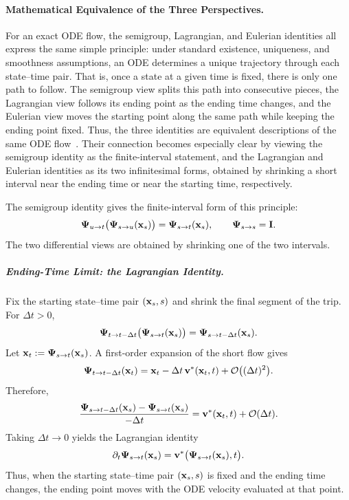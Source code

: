 \paragraph{Mathematical Equivalence of the Three Perspectives.}
For an exact ODE flow, the semigroup, Lagrangian, and Eulerian identities
all express the same simple principle: under standard existence,
uniqueness, and smoothness assumptions, an ODE determines a unique
trajectory through each state--time pair. That is, once a state at a
given time is fixed, there is only one path to follow. The semigroup view
splits this path into consecutive pieces, the Lagrangian view follows its
ending point as the ending time changes, and the Eulerian view moves the
starting point along the same path while keeping the ending point fixed.
Thus, the three identities are equivalent descriptions of the same ODE
flow~\citep{arnold1988geometrical,chorin1993mathematical}. Their
connection becomes especially clear by viewing the semigroup identity as
the finite-interval statement, and the Lagrangian and Eulerian identities
as its two infinitesimal forms, obtained by shrinking a short interval near the ending time or near the
starting time, respectively.

The semigroup identity gives the finite-interval form of this principle:
\[
    {\bm{\Psi}}_{u\to t}\big({\bm{\Psi}}_{s\to u}({\mathbf{x}}_s)\big)
    =
    {\bm{\Psi}}_{s\to t}({\mathbf{x}}_s),
    \qquad
    {\bm{\Psi}}_{s\to s}={\mathbf{I}} .
\]
The two differential views are obtained by shrinking one of the two intervals.

\subparagraph{Ending-Time Limit: the Lagrangian Identity.}
Fix the starting state--time pair $({\mathbf{x}}_s,s)$ and shrink the final
segment of the trip. For $\Delta t>0$,
\[
    {\bm{\Psi}}_{t\to t-\Delta t}
    \big({\bm{\Psi}}_{s\to t}({\mathbf{x}}_s)\big)
    =
    {\bm{\Psi}}_{s\to t-\Delta t}({\mathbf{x}}_s).
\]
Let ${\mathbf{x}}_t:={\bm{\Psi}}_{s\to t}({\mathbf{x}}_s)$.  A first-order expansion of the short
flow gives
\[
    {\bm{\Psi}}_{t\to t-\Delta t}({\mathbf{x}}_t)
    =
    {\mathbf{x}}_t-\Delta t\,{\mathbf{v}}^*({\mathbf{x}}_t,t)
    +\mathcal{O}\big((\Delta t)^2\big).
\]
Therefore,
\[
    \frac{
    {\bm{\Psi}}_{s\to t-\Delta t}({\mathbf{x}}_s)
    -
    {\bm{\Psi}}_{s\to t}({\mathbf{x}}_s)}
    {-\Delta t}
    =
    {\mathbf{v}}^*({\mathbf{x}}_t,t)
    +\mathcal{O}(\Delta t).
\]
Taking $\Delta t\to0$ yields the Lagrangian identity
\[
    \partial_t{\bm{\Psi}}_{s\to t}({\mathbf{x}}_s)
    =
    {\mathbf{v}}^*\big({\bm{\Psi}}_{s\to t}({\mathbf{x}}_s),t\big).
\]
Thus, when the starting state--time pair $({\mathbf{x}}_s,s)$ is fixed and the
ending time changes, the ending point moves with the ODE velocity
evaluated at that point.

